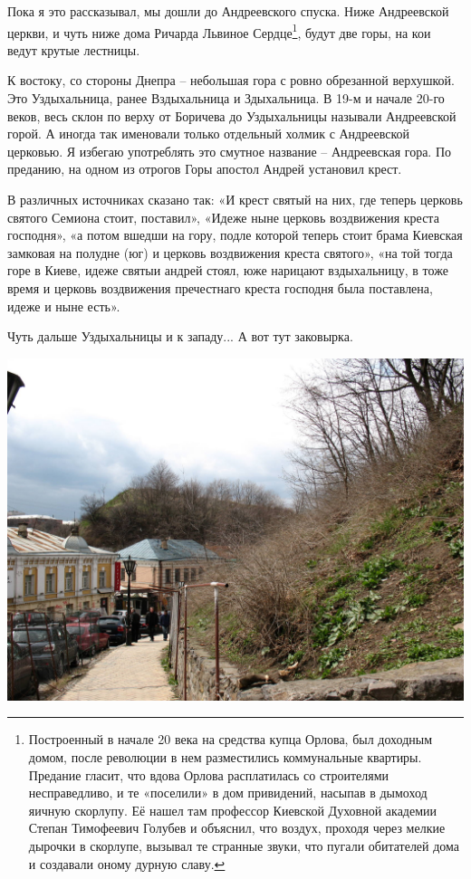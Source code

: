 Пока я это рассказывал, мы дошли до Андреевского спуска. Ниже Андреевской церкви, и чуть ниже дома Ричарда Львиное Сердце\footnote{Построенный в начале 20 века на средства купца Орлова, был доходным домом, после революции в нем разместились коммунальные квартиры. Предание гласит, что вдова Орлова расплатилась со строителями несправедливо, и те «поселили» в дом привидений, насыпав в дымоход яичную скорлупу. Её нашел там профессор Киевской Духовной академии Степан Тимофеевич Голубев и объяснил, что воздух, проходя через мелкие дырочки в скорлупе, вызывал те странные звуки, что пугали обитателей дома и создавали оному дурную славу.}, будут две горы, на кои ведут крутые лестницы.

К востоку, со стороны Днепра – небольшая гора с ровно обрезанной верхушкой. Это Уздыхальница, ранее Вздыхальница и Здыхальница. В 19-м и начале 20-го веков, весь склон по верху от Боричева до Уздыхальницы называли Андреевской горой. А иногда так именовали только отдельный холмик с Андреевской церковью. Я избегаю употреблять это смутное название – Андреевская гора. По преданию, на одном из отрогов Горы апостол Андрей установил крест.

В различных источниках сказано так: «И крест святый на них, где теперь церковь святого Семиона стоит, поставил», «Идеже ныне церковь воздвижения креста господня», «а потом вшедши на гору, подле которой теперь стоит брама Киевская замковая на полудне (юг) и церковь воздвижения креста святого», «на той тогда горе в Киеве, идеже святыи андрей стоял, юже нарицают вздыхальницу, в тоже время и церковь воздвижения пречестнаго креста господня была поставлена, идеже и ныне есть».

Чуть дальше Уздыхальницы и к западу... А вот тут заковырка.

\begin{center}
\includegraphics[width=\linewidth]{chast-colebanie-osnov/gora-zamkovaya-valovaya/s_IMG_1195.JPG}
\end{center}

